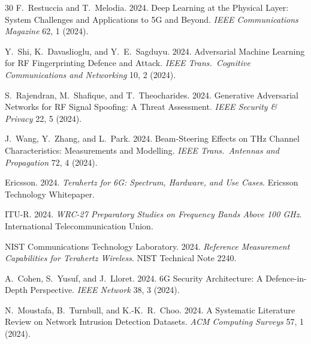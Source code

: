 \documentclass[sigconf,nonacm]{acmart}
\begin{document}
\begin{thebibliography}{30}
F.~Restuccia and T.~Melodia. 2024. Deep Learning at the Physical
Layer: System Challenges and Applications to 5G and Beyond.
\textit{IEEE Communications Magazine} 62, 1 (2024).

Y.~Shi, K.~Davaslioglu, and Y.~E.~Sagduyu. 2024. Adversarial
Machine Learning for RF Fingerprinting Defence and Attack.
\textit{IEEE Trans.\ Cognitive Communications and Networking}
10, 2 (2024).

S.~Rajendran, M.~Shafique, and T.~Theocharides. 2024. Generative
Adversarial Networks for RF Signal Spoofing: A Threat Assessment.
\textit{IEEE Security \& Privacy} 22, 5 (2024).

J.~Wang, Y.~Zhang, and L.~Park. 2024. Beam-Steering Effects on
THz Channel Characteristics: Measurements and Modelling.
\textit{IEEE Trans.\ Antennas and Propagation} 72, 4 (2024).

Ericsson. 2024. \textit{Terahertz for 6G: Spectrum, Hardware,
and Use Cases}. Ericsson Technology Whitepaper.

ITU-R. 2024. \textit{WRC-27 Preparatory Studies on Frequency
Bands Above 100 GHz}. International Telecommunication Union.

NIST Communications Technology Laboratory. 2024. \textit{Reference
Measurement Capabilities for Terahertz Wireless}. NIST Technical
Note 2240.

A.~Cohen, S.~Yusuf, and J.~Lloret. 2024. 6G Security Architecture:
A Defence-in-Depth Perspective. \textit{IEEE Network} 38, 3 (2024).

N.~Moustafa, B.~Turnbull, and K.-K.~R.~Choo. 2024. A Systematic
Literature Review on Network Intrusion Detection Datasets.
\textit{ACM Computing Surveys} 57, 1 (2024).

\end{thebibliography}
\end{document}
